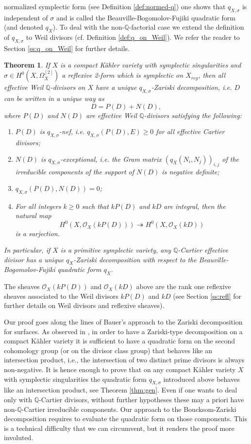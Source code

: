 \documentclass[12pt,reqno]{amsart}
\def\Q{{\mathbb Q}}
\newtheorem{thm}{Theorem}[section]
\theoremstyle{plain}
\theoremstyle{definition}
\begin{document}
normalized symplectic form (see Definition \ref{def:normed-q}) one shows that $q_{X,\sigma}$ is independent of $\sigma$ and is called the Beauville-Bogomolov-Fujiki quadratic form { (and denoted $q_X$)}. 
To deal with the non-$\Q$-factorial case we extend  the definition of $q_{X ,\sigma}$ to Weil divisors (cf. Definition \ref{def:q_on_Weil}). We refer the reader  to Section \ref{ss:q_on_Weil} for further details.   


\begin{thm}\label{thm:q-Zar-intro}
If $X$ is a compact K\"ahler variety with symplectic singularities and $\sigma\in H^0(X,\Omega^{[2]}_X)$ a reflexive 2-form which is symplectic on $X_{reg}$, 
then all effective Weil $\Q$-divisors on $X$ have a unique $q_{X,\sigma}$-Zariski decomposition, i.e. $D$ can be written in a unique way as 
$$
 D= P(D) + N(D),
$$
where $P(D)$ and $N(D)$ are effective Weil $\Q$-divisors satisfying the following:
\begin{enumerate}
\item[1)] $P(D)$ is $q_{X,\sigma}$-nef, i.e. $q_{X,\sigma}(P(D),E)\geq 0$ for all effective Cartier divisors;
\item[2)] $N(D)$ is $q_{X,\sigma}$-exceptional, i.e.  the Gram matrix   $(q_{X}(N_i,N_j))_{i,j}$ of the irreducible components of the support of $N(D)$ 
is negative definite;
\item[3)] $q_{X,\sigma}(P(D),N(D))=0$;
\item[4)] For all integers $k\geq 0$ such that $kP(D)$ and $kD$ are integral, then the natural map 
$$
 H^0(X,\mathcal O_X(kP(D)))\twoheadrightarrow H^0(X,\mathcal O_X(kD))
$$
is a surjection.
\end{enumerate}

   
In particular, if $X$ is a primitive symplectic variety, any  $\Q$-Cartier effective divisor has a unique $q_X$-Zariski decomposition with respect to the Beauville-Bogomolov-Fujiki quadratic form $q_X$.
\end{thm}
The sheaves $\mathcal O_X(kP(D))$ and $\mathcal O_X(kD)$ above are the rank one reflexive sheaves associated to the Weil divisors $kP(D)$ and $kD$ (see Section \ref{ss:refl} for further details on Weil divisors and reflexive sheaves).   

Our proof goes along  the lines of Bauer's approach \cite{Bauer} to the Zariski decomposition for surfaces. As observed in \cite{Baueretal}, in order to have a Zariski-type decomposition on a compact K\"ahler variety it is sufficient to have a quadratic form on the second cohomology group (or on the divisor class group) that behaves like an intersection product, i.e., the intersection of two distinct prime divisors is always non-negative.  It is hence enough to prove that on any compact K\"ahler variety $X$ with symplectic singularities the quadratic form $q_{X,\sigma}$ introduced above behaves like an intersection product, see Theorem \ref{thm:gen}. 
Even if one wants to  deal only with $\Q$-Cartier divisors, without further hypotheses these may a priori have non-$\Q$-Cartier irreducible components. Our approach to the Boucksom-Zariski decomposition requires to evaluate the quadratic form on those components. This is a technical difficulty that we can circumvent, but it renders the proof more involuted. 
\end{document}
